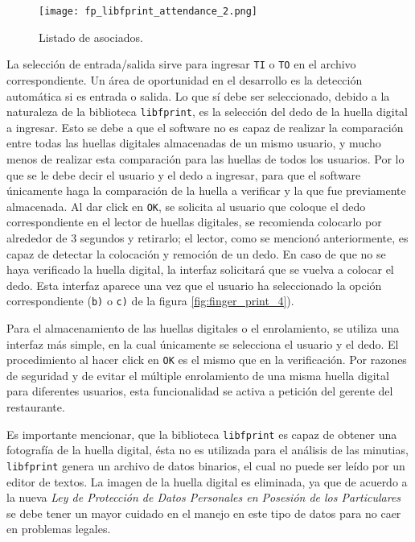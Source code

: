 \begin{figure}[htb]
 \begin{center}
  \texttt{[image: fp\_libfprint\_attendance\_2.png]}
 \end{center}
 \caption{Listado de asociados.}
 \label{fig:finger_print_6}
\end{figure}

La selección de entrada/salida sirve para ingresar \texttt{TI} o \texttt{TO} en el archivo correspondiente. Un área de oportunidad en el desarrollo es la detección automática si es entrada o salida. Lo que sí debe ser seleccionado, debido a la naturaleza de la biblioteca \texttt{libfprint}, es la selección del dedo de la huella digital a ingresar. Esto se debe a que el software no es capaz de realizar la comparación entre todas las huellas digitales almacenadas de un mismo usuario, y mucho menos de realizar esta comparación para las huellas de todos los usuarios. Por lo que se le debe decir el usuario y el dedo a ingresar, para que el software únicamente haga la comparación de la huella a verificar y la que fue previamente almacenada. Al dar click en \texttt{OK}, se solicita al usuario que coloque el dedo correspondiente en el lector de huellas digitales, se recomienda colocarlo por alrededor de 3 segundos y retirarlo; el lector, como se mencionó anteriormente, es capaz de detectar la colocación  y remoción de un dedo. En caso de que no se haya verificado la huella digital, la interfaz solicitará que se vuelva a colocar el dedo. Esta interfaz aparece una vez que el usuario ha seleccionado la opción correspondiente (\texttt{b)} o \texttt{c)} de la figura \ref{fig:finger_print_4}).

Para el almacenamiento de las huellas digitales o el enrolamiento, se utiliza una interfaz más simple, en la cual únicamente se selecciona el usuario y el dedo. El procedimiento al hacer click en \texttt{OK} es el mismo que en la verificación. Por razones de seguridad y de evitar el múltiple enrolamiento de una misma huella digital para diferentes usuarios, esta funcionalidad se activa a petición del gerente del restaurante.

Es importante mencionar, que la biblioteca \texttt{libfprint} es capaz de obtener una fotografía de la huella digital, ésta no es utilizada para el análisis de las minutias, \texttt{libfprint} genera un archivo de datos binarios, el cual no puede ser leído por un editor de textos. La imagen de la huella digital es eliminada, ya que de acuerdo a la nueva \textit{Ley de Protección de Datos Personales en Posesión de los Particulares} se debe tener un mayor cuidado en el manejo en este tipo de datos para no caer en problemas legales.


